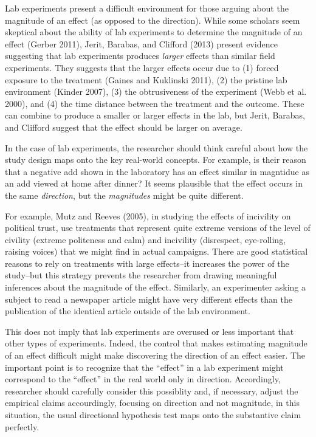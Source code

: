 \documentclass[12pt]{article}
\begin{document}

Lab experiments present a difficult environment for those arguing about the magnitude of an effect (as opposed to the direction). While some scholars seem skeptical about the ability of lab experiments to determine the magnitude of an effect (Gerber 2011), Jerit, Barabas, and Clifford (2013) present evidence suggesting that lab experiments produces \textit{larger} effects than similar field experiments. They suggests that the larger effects occur due to (1) forced exposure to the treatment (Gaines and Kuklinski 2011), (2) the pristine lab environment (Kinder 2007), (3) the obtrusiveness of the experiment (Webb et al. 2000), and (4) the time distance between the treatment and the outcome. These can combine to produce a smaller or larger effects in the lab, but Jerit, Barabas, and Clifford suggest that the effect should be larger on average.

In the case of lab experiments, the researcher should think careful about how the study design maps onto the key real-world concepts. For example, is their reason that a negative add shown in the laboratory has an effect similar in magntidue as an add viewed at home after dinner? It seems plausible that the effect occurs in the same \emph{direction}, but the \emph{magnitudes} might be quite different.

For example, Mutz and Reeves (2005), in studying the effects of incivility on political trust, use treatments that represent quite extreme versions of the level of civility (extreme politeness and calm) and incivility (disrespect, eye-rolling, raising voices) that we might find in actual campaigns. There are good statistical reasons to rely on treatments with large effects--it increases the power of the study--but this strategy prevents the researcher from drawing meaningful inferences about the magnitude of the effect. Similarly, an experimenter asking a subject to read a newspaper article might have very different effects than the publication of the identical article outside of the lab environment.

This does not imply that lab experiments are overused or less important that other types of experiments. Indeed, the control that makes estimating magnitude of an effect difficult might make discovering the direction of an effect easier. The important point is to recognize that the ``effect'' in a lab experiment might correspond to the ``effect'' in the real world only in direction. Accordingly, researcher should carefully consider this possiblity and, if necessary, adjust the empirical claims accourdingly, focusing on direction and not magnitude, in this situation, the usual directional hypothesis test maps onto the substantive claim perfectly.
\end{document}
